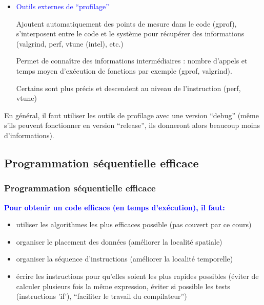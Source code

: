 \documentclass{beamer}
\begin{document}
\begin{frame}
	\begin{itemize}
	\item  \textcolor{blue}{Outils externes de ``profilage''}
	
	\medskip
	Ajoutent automatiquement des points de mesure dans le
	code (gprof), s’interposent entre le code et le système pour récupérer des informations
	(valgrind, perf,
vtune (intel), etc.)
		
\vfill
	Permet de connaître des informations intermédiaires : nombre d’appels et temps
	moyen d’exécution de fonctions par exemple (gprof, valgrind).
	
	Certains sont plus précis et descendent au niveau de l'instruction (perf, vtune)
	\end{itemize}

\vfill
	En général, il faut utiliser les outils de profilage avec
	une version ``debug'' (même s'ils peuvent fonctionner en version ``release'', ils donneront alors beaucoup moins d'informations). 
\vfill
    
\end{frame}

\begin{frame}
\section{Programmation s\'equentielle efficace}
\frametitle{Programmation s\'equentielle efficace}

\bf
\textcolor{blue}{Pour obtenir un code efficace (en temps d'ex\'ecution), il faut:}

\begin{itemize}
	\item utiliser les algorithmes les plus efficaces possible (pas couvert par ce cours)
	
	\item organiser le placement des donn\'ees (am\'eliorer la localit\'e spatiale)
	
	\item organiser la s\'equence d'instructions (am\'eliorer la localit\'e temporelle)

	\item \'ecrire les instructions pour qu'elles soient les plus rapides possibles (éviter de calculer plusieurs fois la même expression, \'eviter si possible les tests (instructions 'if'), ``faciliter le travail du compilateur'')
\end{itemize}
\end{frame}
\end{document}
